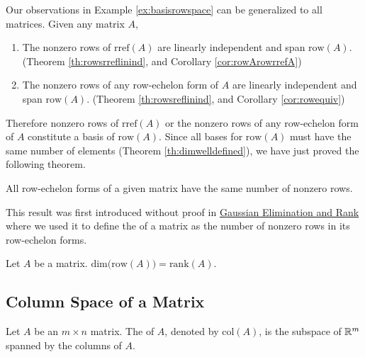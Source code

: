 \documentclass{ximera}
\begin{document}
Our observations in Example \ref{ex:basisrowspace} can be generalized to all matrices.  Given any matrix $A$,
\begin{enumerate}
    \item The nonzero rows of $\mbox{rref}(A)$ are linearly independent and span $\mbox{row}(A)$.  (Theorem \ref{th:rowsrreflinind}, and Corollary \ref{cor:rowArowrrefA})
    \item The nonzero rows of any row-echelon form of $A$ are linearly independent and span $\mbox{row}(A)$.  (Theorem \ref{th:rowsreflinind}, and Corollary \ref{cor:rowequiv})
\end{enumerate}
Therefore nonzero rows of $\mbox{rref}(A)$ or the nonzero rows of any row-echelon form of $A$ constitute a basis of $\mbox{row}(A)$.  Since all bases for $\mbox{row}(A)$ must have the same number of elements (Theorem \ref{th:dimwelldefined}), we have just proved the following theorem.

\begin{theorem}\label{th:samenumberofnonzerorows}
All row-echelon forms of a given matrix have the same number of nonzero rows.
\end{theorem}

This result was first introduced without proof in \href{https://ximera.osu.edu/oerlinalg/LinearAlgebra/SYS-0030/main}{Gaussian Elimination and Rank} where we used it to define the  of a matrix as the number of nonzero rows in its row-echelon forms.

\begin{theorem}\label{th:dimofrowA}
Let $A$ be a matrix.  
$\mbox{dim}\Big(\mbox{row}(A)\Big)=\mbox{rank}(A)$.
\end{theorem}


\subsection*{Column Space of a Matrix}
\begin{definition}\label{def:colspace} Let $A$ be an $m\times n$ matrix.  The  of $A$, denoted by $\mbox{col}(A)$, is the subspace of $\mathbb{R}^m$ spanned by the columns of $A$.
\end{definition}
\end{document}
